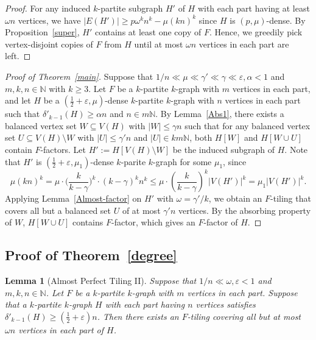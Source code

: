 \documentclass[11pt,a4paper]{article}
\newtheorem{lemma}[thm]{Lemma}
\theoremstyle{definition}
\begin{document}
\begin{proof}
    For any induced $k$-partite subgraph $H'$ of $H$ with each part having at least $\omega n$ vertices, we have $|E(H')|\geq p\omega^k n^k-\mu (kn)^k$ since $H$ is $(p,\mu)$-dense. By Proposition~\ref{super}, $H'$ contains at least one copy of $F$. Hence, we greedily pick vertex-disjoint copies of $F$ from $H$ until at most $\omega n$ vertices in each part are left.
\end{proof}

\begin{proof}[Proof of Theorem~\ref{main}]
    Suppose that $1/n\ll \mu \ll \gamma' \ll \gamma \ll \varepsilon,\alpha<1$ and $m,k,n\in \mathbb{N}$ with $k\geq 3$. Let $F$ be a $k$-partite $k$-graph with $m$ vertices in each part, and let $H$ be a $(\frac{1}{2}+\varepsilon, \mu)$-dense $k$-partite $k$-graph with $n$ vertices in each part such that $\delta'_{k-1}(H)\geq \alpha n$ and $n\in m\mathbb{N}$. By Lemma~\ref{Abs1}, there exists a balanced vertex set $W \subseteq V (H)$ with $|W| \leq \gamma n$ such that for any balanced vertex set $U\subseteq V(H)\setminus W$ with $|U|\leq \gamma' n$ and $|U|\in km\mathbb{N}$, both $H[W]$ and $H[W \cup U]$ contain $F$-factors. Let $H':=H[V(H)\setminus W]$ be the induced subgraph of $H$. Note that $H'$ is $(\frac{1}{2}+\varepsilon,\mu_1)$-dense $k$-parite $k$-graph for some $\mu_1$, since $$\mu (kn)^k= \mu\cdot \big(\frac{k}{k-\gamma}\big)^k\cdot (k-\gamma)^kn^k\leq \mu \cdot (\frac{k}{k-\gamma})^k|V(H')|^k=\mu_1|V(H')|^k.$$
    Applying Lemma~\ref{Almost-factor} on $H'$ with $\omega =\gamma '/k$, we obtain an $F$-tiling that covers all but a balanced set $U$ of at most $\gamma' n$ vertices. By the absorbing property of $W$, $H[W\cup U]$ contains $F$-factor, which gives an $F$-factor of $H$.


\end{proof}

\subsection{Proof of Theorem~\ref{degree}}



\begin{lemma}[Almost Perfect Tiling II]\label{almost2}
    Suppose that $1/n \ll \omega ,\varepsilon<1$ and $m,k,n\in \mathbb{N}$. Let $F$ be a $k$-partite $k$-graph with $m$ vertices in each part. Suppose that a $k$-partite $k$-graph $H$ with each part having $n$ vertices satisfies $\delta'_{k-1}(H)\geq (\frac{1}{2}+\varepsilon)n$. Then there exists an $F$-tiling covering all but at most $\omega n$ vertices in each part of $H$.
\end{lemma}
\end{document}
